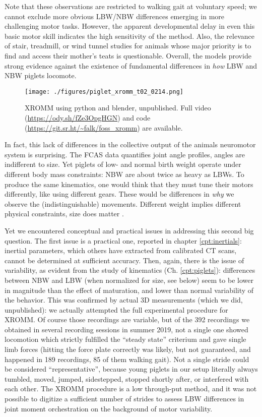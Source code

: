 Note that these observations are restricted to walking gait at voluntary speed; we cannot exclude more obvious LBW/NBW differences emerging in more challenging motor tasks.
However, the apparent developmental delay in even this basic motor skill indicates the high sensitivity of the method.
Also, the relevance of stair, treadmill, or wind tunnel studies for animals whose major priority is to find and access their mother's teats is questionable.
Overall, the models provide strong evidence against the existence of fundamental differences in \emph{how} LBW and NBW piglets locomote.



\begin{figure}[htbp]
\centering
\texttt{[image: ./figures/piglet\_xromm\_t02\_0214.png]}
\caption{\label{fig:piglet_xromm}XROMM using python and blender, unpublished. Full video (\url{https://ody.sh/fZe3OpgHGN}) and code (\url{https://git.sr.ht/\~falk/foss\_xromm}) are available.}
\end{figure}

In fact, this lack of differences in the collective output of the animals neuromotor system is surprising.
The FCAS data quantifies joint angle profiles, angles are indifferent to size.
Yet piglets of low- and normal birth weight operate under different body mass constraints: NBW are about twice as heavy as LBWs.
To produce the same kinematics, one would think that they must tune their motors differently, like using different gears.
These would be differences in \emph{why} we observe the (indistinguishable) movements.
Different weight implies different physical constraints, size does matter \citep{Aerts2023}.

Yet we encountered conceptual and practical issues in addressing this second big question.
The first issue is a practical one, reported in chapter \ref{cpt:inertials}: inertial parameters, which others have extracted from calibrated CT scans, cannot be determined at sufficient accuracy.
Then, again, there is the issue of variability, as evident from the study of kinematics (Ch. \ref{cpt:piglets}):
differences between NBW and LBW (when normalized for size, see below) seem to be lower in magnitude than the effect of maturation, and lower than normal variability of the behavior.
This was confirmed by actual 3D measurements (which we did, unpublished): we actually attempted the full experimental procedure for XROMM.
Of course those recordings are variable, but of the 392 recordings we obtained in several recording sessions in summer 2019, not a single one showed locomotion which strictly fulfilled the ``steady state'' criterium and gave single limb forces (hitting the force plate correctly was likely, but not guaranteed, and happened in 189 recordings, 85 of them walking gait).
Not a single stride could be considered ``representative'', because young piglets in our setup literally always tumbled, moved, jumped, sidestepped, stopped shortly after, or interfered with each other.
The XROMM procedure is a low through-put method, and it was not possible to digitize a sufficient number of strides to assess LBW differences in joint moment orchestration on the background of motor variability.


